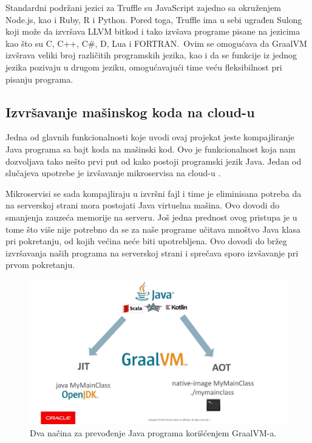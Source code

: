 \documentclass[a4paper]{article}
\begin{document}
Standardni podržani jezici za Truffle su JavaScript zajedno sa okruženjem Node.js, kao i Ruby, R i Python. Pored toga, Truffle ima u sebi ugrađen Sulong koji može da izvršava LLVM bitkod i tako izvšava programe pisane na jezicima kao što su C, C++, C\#, D, Lua i FORTRAN.\ Ovim se omogućava da GraalVM izvšrava veliki broj različitih programskih jezika, kao i da se funkcije iz jednog jezika pozivaju u drugom jeziku, omogućavajući time veću fleksibilnost pri pisanju programa.

\subsection{Izvršavanje mašinskog koda na cloud-u}
\label{sub:cloud}

Jedna od glavnih funkcionalnosti koje uvodi ovaj projekat jeste kompajliranje Java programa sa bajt koda na mašinski kod. Ovo je funkcionalnost koja nam dozvoljava tako nešto prvi put od kako postoji programski jezik Java. Jedan od slučajeva upotrebe je izvšavanje mikroservisa na cloud-u \cite{sipek21}.

Mikroservisi se sada kompajliraju u izvršni fajl i time je eliminisana potreba da na serverskoj strani mora postojati Java virtuelna mašina. Ovo dovodi do smanjenja zauzeća memorije na serveru. Još jedna prednost ovog pristupa je u tome što više nije potrebno da se za naše programe učitava mnoštvo Java klasa pri pokretanju, od kojih većina neće biti upotrebljena. Ovo dovodi do bržeg izvršavanja naših programa na serverskoj strani i sprečava sporo izvšavanje pri prvom pokretanju. 

\begin{figure}
	\begin{center}
	\includegraphics[scale=0.25]{imgs/run_java.jpg}
	\end{center}
	\caption{Dva načina za prevođenje Java programa korišćenjem GraalVM-a.}
	\label{fig:runjava}
\end{figure}
\end{document}

